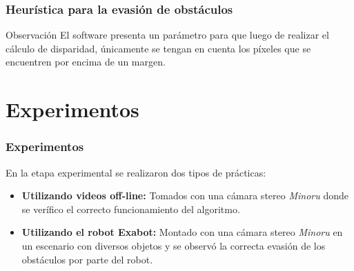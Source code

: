 \documentclass[svgnames]{beamer}
\begin{document}
\begin{frame}
\frametitle{Heur\'istica para la evasi\'on de obst\'aculos}
\begin{block}{Observaci\'on}
El software presenta un par\'ametro para que luego de realizar el c\'alculo de disparidad, \'unicamente se tengan en cuenta los p\'ixeles que se encuentren por encima de un margen.

\end{block}

\end{frame}

%
%

\section{Experimentos}

\begin{frame}
\frametitle{Experimentos}
En la etapa experimental se realizaron dos tipos de pr\'acticas:
\begin{itemize}

	\item {\bf Utilizando videos off-line:} Tomados con una c\'amara stereo \emph{Minoru} donde se ver\'ifico el correcto funcionamiento del algoritmo.
	
	\item {\bf Utilizando el robot Exabot:} Montado con una c\'amara stereo \emph{Minoru} en un escenario con diversos objetos y se observ\'o la correcta evasi\'on de los obst\'aculos por parte del robot.
\end{itemize}

\end{frame}



\end{document}
